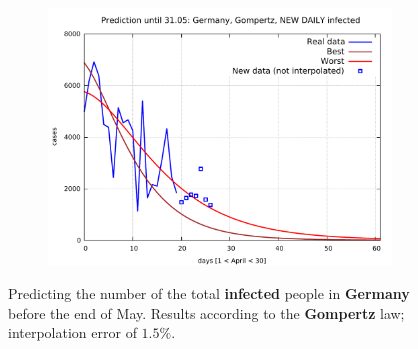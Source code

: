 \documentclass[8pt]{article}
\begin{document}
\begin{figure}[h!]
\begin{subfigure}[b]{0.48\linewidth}
  \includegraphics[width=\linewidth]{../de_g_t/peak/peak_prediction.pdf}
  \end{subfigure}
	\caption{Predicting the number of the total \textbf{infected}
	people in \textbf{Germany}
	before the end of May. Results according to the 
	\textbf{Gompertz}
	law; interpolation error of $1.5\%$.}
\end{figure}
\end{document}
